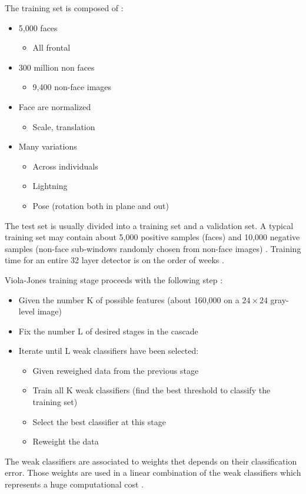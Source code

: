 \noindent The training set is composed of \cite{UBC01}:

\begin{itemize}
  \item 5,000 faces
  \begin{itemize}
  	\item All frontal
  \end{itemize}
  \item 300 million non faces
  \begin{itemize}
  	\item 9,400 non-face images
  \end{itemize}
  \item Face are normalized
  \begin{itemize}
  	\item Scale, translation
  \end{itemize}
  \item Many variations
  \begin{itemize}
  	\item Across individuals
	\item Lightning
	\item Pose (rotation both in plane and out)
  \end{itemize}
\end{itemize}

\vspace{\baselineskip}
\noindent The test set is usually divided into a training set and a validation set. A typical training set may contain about 5,000 positive samples (faces) and 10,000 negative samples (non-face sub-windows randomly chosen from non-face images) \cite{DIN08}. Training time for an entire 32 layer detector is on the order of weeks \cite{VIO01}.
\newline

\noindent Viola-Jones training stage proceeds with the following step \cite{DIN08}:

\begin{itemize}
  \item Given the number K of possible features (about 160,000 on a $ 24\times24 $ gray-level image)
  \item Fix the number L of desired stages in the cascade
  \item Iterate until L weak classifiers have been selected:
  \begin{itemize}
  	\item Given reweighed data from the previous stage
	\item Train all K weak classifiers (find the best threshold to classify the training set)
	\item Select the best classifier at this stage
	\item Reweight the data
  \end{itemize}
\end{itemize}

\noindent The weak classifiers are associated to weights thet depends on their classification error. Those weights are used in a linear combination of the weak classifiers which represents a huge computational cost \cite{DIN08}.
\newline





